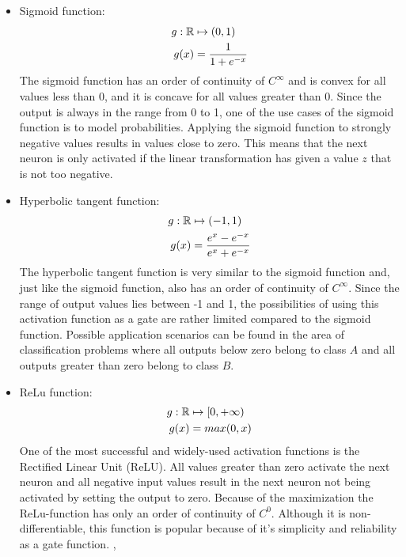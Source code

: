 \begin{itemize}
	\item Sigmoid function: 
		\begin{equation}
		\begin{split}
			g: \mathbb{R} 	& \mapsto (0,1) \\
			g(x) 	& = \frac{1}{1+e^{-x}} 
		\end{split}
		\end{equation}
		The sigmoid function has an order of continuity of $C^{\infty}$ and is convex for all values less than 0, and it is concave for all values greater than 0. Since the output is always in the range from 0 to 1, one of the use cases of the sigmoid function is to model probabilities. Applying the sigmoid function to strongly negative values results in values close to zero. This means that the next neuron is only activated if the linear transformation has given a value $z$ that is not too negative. 
	\item Hyperbolic tangent function: 
		\begin{equation}
		\begin{split}
			g: \mathbb{R} 	& \mapsto (-1,1) \\
			g(x) 	& = \frac{e^x - e^{-x}}{e^x + e^{-x}} 
		\end{split}
		\end{equation}
		The hyperbolic tangent function is very similar to the sigmoid function and, just like the sigmoid function, also has an order of continuity of $C^{\infty}$. Since the range of output values lies between -1 and 1, the possibilities of using this activation function as a gate are rather limited compared to the sigmoid function. Possible application scenarios can be found in the area of classification problems where all outputs below zero belong to class $A$ and all outputs greater than zero belong to class $B$. 
		
	\item ReLu function: 
		\begin{equation}\label{eq:relu}
		\begin{split}
			g: \mathbb{R} 	& \mapsto [0,+ \infty) \\
			g(x) 	& = max(0,x) 
		\end{split}
		\end{equation}
		One of the most successful and widely-used activation functions is the Rectified Linear Unit (ReLU). All values greater than zero activate the next neuron and all negative input values result in the next neuron not being activated by setting the output to zero. Because of the maximization the ReLu-function has only an order of continuity of $C^0$. Although it is non-differentiable, this function is popular because of it's simplicity and reliability as a gate function. \cite{searchingActivation}, \cite{nair2010rectified}
			

\end{itemize}
